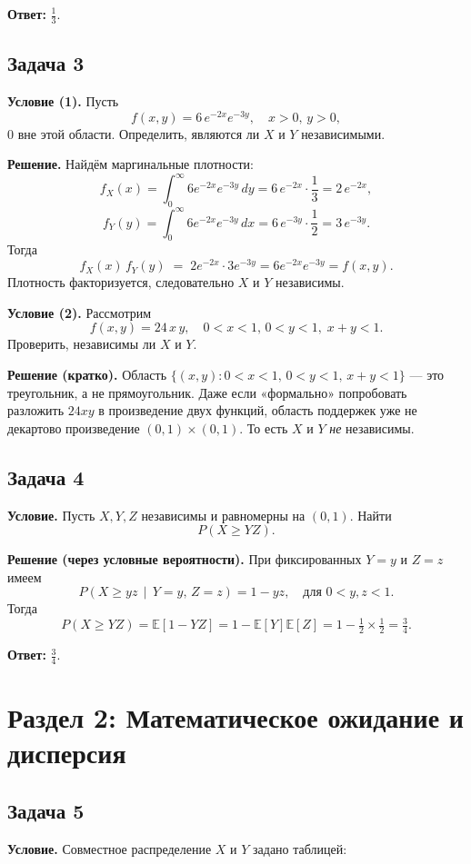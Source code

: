 \documentclass[12pt]{article}
\begin{document}
\textbf{Ответ:} \(\frac{1}{3}.\)

\subsection*{Задача 3}
\textbf{Условие (1).} Пусть
\[
f(x,y)=6\,e^{-2x}e^{-3y},\quad x>0,\,y>0,
\]
0 вне этой области. Определить, являются ли \(X\) и \(Y\) независимыми.

\textbf{Решение.}  
Найдём маргинальные плотности:
\[
f_X(x)=\int_0^\infty 6 e^{-2x} e^{-3y}\,dy=6\,e^{-2x}\cdot\frac{1}{3}=2\,e^{-2x},
\]
\[
f_Y(y)=\int_0^\infty 6 e^{-2x} e^{-3y}\,dx=6\,e^{-3y}\cdot\frac{1}{2}=3\,e^{-3y}.
\]
Тогда
\[
f_X(x)\,f_Y(y) \;=\;2e^{-2x}\cdot 3e^{-3y}
=6e^{-2x}e^{-3y} = f(x,y).
\]
Плотность факторизуется, следовательно \(X\) и \(Y\) независимы.

\vspace{1em}

\noindent\textbf{Условие (2).} Рассмотрим
\[
f(x,y) = 24\,x\,y,\quad 0<x<1,\,0<y<1,\;x+y<1.
\]
Проверить, независимы ли \(X\) и \(Y\).

\textbf{Решение (кратко).}  
Область \(\{(x,y)\colon 0<x<1,\,0<y<1,\,x+y<1\}\) — это треугольник, а не прямоугольник. Даже если «формально» попробовать разложить \(24xy\) в произведение двух функций, область поддержек уже не декартово произведение \((0,1)\times (0,1)\). То есть \(X\) и \(Y\) \emph{не} независимы.

\subsection*{Задача 4}
\textbf{Условие.} Пусть \(X, Y, Z\) независимы и равномерны на \((0,1)\). Найти
\[
P(X \ge YZ).
\]

\textbf{Решение (через условные вероятности).}  
При фиксированных \(Y=y\) и \(Z=z\) имеем
\[
P(X \ge yz \,\mid\, Y=y,\,Z=z) = 1 - yz,\quad\text{для }0<y,z<1.
\]
Тогда
\[
P(X\ge YZ)=\mathbb{E}[1-YZ]=1-\mathbb{E}[Y]\mathbb{E}[Z]=1-\tfrac12\times \tfrac12 = \tfrac34.
\]

\textbf{Ответ:} \(\frac{3}{4}.\)

\section*{Раздел 2: Математическое ожидание и дисперсия}

\subsection*{Задача 5}
\textbf{Условие.} Совместное распределение \(X\) и \(Y\) задано таблицей:
\end{document}
